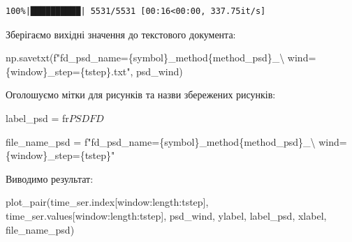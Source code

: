 \documentclass[
  letterpaper,
]{report}
\newenvironment{Shaded}{\begin{snugshade}}{\end{snugshade}}
\newcommand{\CharTok}[1]{\textcolor[rgb]{0.13,0.47,0.30}{#1}}
\newcommand{\NormalTok}[1]{\textcolor[rgb]{0.00,0.23,0.31}{#1}}
\newcommand{\OperatorTok}[1]{\textcolor[rgb]{0.37,0.37,0.37}{#1}}
\newcommand{\SpecialCharTok}[1]{\textcolor[rgb]{0.37,0.37,0.37}{#1}}
\newcommand{\SpecialStringTok}[1]{\textcolor[rgb]{0.13,0.47,0.30}{#1}}
\newcommand{\VerbatimStringTok}[1]{\textcolor[rgb]{0.13,0.47,0.30}{#1}}
\begin{document}
\begin{verbatim}
100%|██████████| 5531/5531 [00:16<00:00, 337.75it/s]
\end{verbatim}

Зберігаємо вихідні значення до текстового документа:

\begin{Shaded}
\begin{Highlighting}[]
\NormalTok{np.savetxt(}\SpecialStringTok{f"fd\_psd\_name=}\SpecialCharTok{\{}\NormalTok{symbol}\SpecialCharTok{\}}\SpecialStringTok{\_method}\SpecialCharTok{\{}\NormalTok{method\_psd}\SpecialCharTok{\}}\SpecialStringTok{\_}\CharTok{\textbackslash{}}
\SpecialStringTok{           wind=}\SpecialCharTok{\{}\NormalTok{window}\SpecialCharTok{\}}\SpecialStringTok{\_step=}\SpecialCharTok{\{}\NormalTok{tstep}\SpecialCharTok{\}}\SpecialStringTok{.txt"}\NormalTok{, psd\_wind)}
\end{Highlighting}
\end{Shaded}

Оголошуємо мітки для рисунків та назви збережених рисунків:

\begin{Shaded}
\begin{Highlighting}[]
\NormalTok{label\_psd }\OperatorTok{=} \VerbatimStringTok{fr\textquotesingle{}$PSDFD$\textquotesingle{}}

\NormalTok{file\_name\_psd }\OperatorTok{=} \SpecialStringTok{f"fd\_psd\_name=}\SpecialCharTok{\{}\NormalTok{symbol}\SpecialCharTok{\}}\SpecialStringTok{\_method}\SpecialCharTok{\{}\NormalTok{method\_psd}\SpecialCharTok{\}}\SpecialStringTok{\_}\CharTok{\textbackslash{}}
\SpecialStringTok{                wind=}\SpecialCharTok{\{}\NormalTok{window}\SpecialCharTok{\}}\SpecialStringTok{\_step=}\SpecialCharTok{\{}\NormalTok{tstep}\SpecialCharTok{\}}\SpecialStringTok{"}
\end{Highlighting}
\end{Shaded}

Виводимо результат:

\begin{Shaded}
\begin{Highlighting}[]
\NormalTok{plot\_pair(time\_ser.index[window:length:tstep],}
\NormalTok{          time\_ser.values[window:length:tstep],}
\NormalTok{          psd\_wind, }
\NormalTok{          ylabel, }
\NormalTok{          label\_psd,}
\NormalTok{          xlabel,}
\NormalTok{          file\_name\_psd)}
\end{Highlighting}
\end{Shaded}
\end{document}
